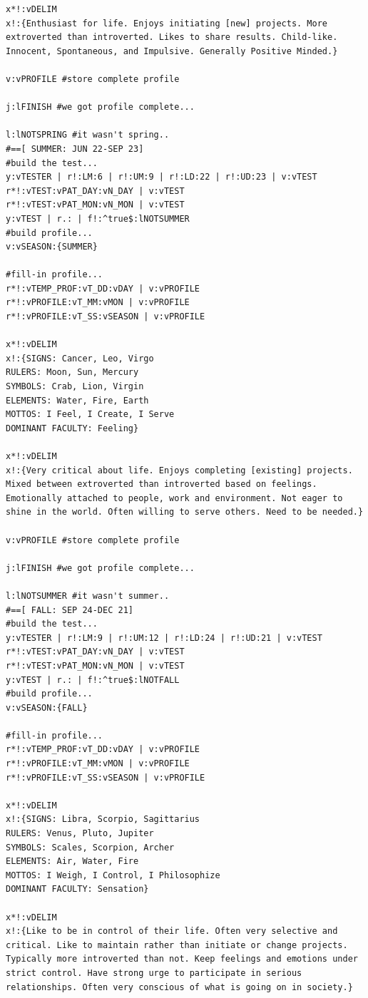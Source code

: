 \documentclass[a4paper, 18pt]{book} %
\begin{document}
{{{\begin{tcolorbox}[teaterminalstyle, title=TEA Program: Personality Calculator v3, breakable]
\begin{lstlisting}[language=TEA,breaklines=true,]
x*!:vDELIM 
x!:{Enthusiast for life. Enjoys initiating [new] projects. More extroverted than introverted. Likes to share results. Child-like. Innocent, Spontaneous, and Impulsive. Generally Positive Minded.}

v:vPROFILE #store complete profile

j:lFINISH #we got profile complete...

l:lNOTSPRING #it wasn't spring..
#==[ SUMMER: JUN 22-SEP 23]
#build the test...
y:vTESTER | r!:LM:6 | r!:UM:9 | r!:LD:22 | r!:UD:23 | v:vTEST 
r*!:vTEST:vPAT_DAY:vN_DAY | v:vTEST
r*!:vTEST:vPAT_MON:vN_MON | v:vTEST
y:vTEST | r.: | f!:^true$:lNOTSUMMER 
#build profile...
v:vSEASON:{SUMMER}

#fill-in profile...
r*!:vTEMP_PROF:vT_DD:vDAY | v:vPROFILE
r*!:vPROFILE:vT_MM:vMON | v:vPROFILE
r*!:vPROFILE:vT_SS:vSEASON | v:vPROFILE

x*!:vDELIM 
x!:{SIGNS: Cancer, Leo, Virgo
RULERS: Moon, Sun, Mercury
SYMBOLS: Crab, Lion, Virgin
ELEMENTS: Water, Fire, Earth
MOTTOS: I Feel, I Create, I Serve
DOMINANT FACULTY: Feeling}

x*!:vDELIM 
x!:{Very critical about life. Enjoys completing [existing] projects. Mixed between extroverted than introverted based on feelings. Emotionally attached to people, work and environment. Not eager to shine in the world. Often willing to serve others. Need to be needed.}

v:vPROFILE #store complete profile

j:lFINISH #we got profile complete...

l:lNOTSUMMER #it wasn't summer..
#==[ FALL: SEP 24-DEC 21]
#build the test...
y:vTESTER | r!:LM:9 | r!:UM:12 | r!:LD:24 | r!:UD:21 | v:vTEST 
r*!:vTEST:vPAT_DAY:vN_DAY | v:vTEST
r*!:vTEST:vPAT_MON:vN_MON | v:vTEST
y:vTEST | r.: | f!:^true$:lNOTFALL 
#build profile...
v:vSEASON:{FALL}

#fill-in profile...
r*!:vTEMP_PROF:vT_DD:vDAY | v:vPROFILE
r*!:vPROFILE:vT_MM:vMON | v:vPROFILE
r*!:vPROFILE:vT_SS:vSEASON | v:vPROFILE

x*!:vDELIM 
x!:{SIGNS: Libra, Scorpio, Sagittarius
RULERS: Venus, Pluto, Jupiter
SYMBOLS: Scales, Scorpion, Archer
ELEMENTS: Air, Water, Fire
MOTTOS: I Weigh, I Control, I Philosophize
DOMINANT FACULTY: Sensation}

x*!:vDELIM 
x!:{Like to be in control of their life. Often very selective and critical. Like to maintain rather than initiate or change projects. Typically more introverted than not. Keep feelings and emotions under strict control. Have strong urge to participate in serious relationships. Often very conscious of what is going on in society.}


\end{lstlisting}
\end{tcolorbox}}}}
\end{document}
